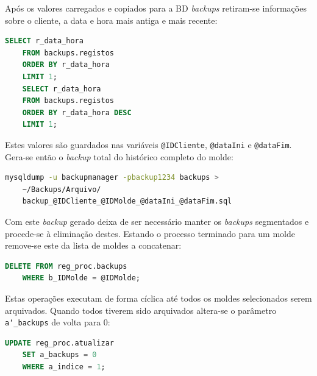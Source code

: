 \documentclass[11pt,twoside,a4paper]{report}
\begin{document}
Após os valores carregados e copiados para a BD \textit{backups} retiram-se informações sobre o cliente, a data e hora mais antiga e mais recente:
\begin{lstlisting}[language = SQL]
	SELECT r_data_hora
	FROM backups.registos
	ORDER BY r_data_hora
	LIMIT 1;
	SELECT r_data_hora
	FROM backups.registos
	ORDER BY r_data_hora DESC
	LIMIT 1;
\end{lstlisting}
Estes valores são guardados nas variáveis \texttt{@IDCliente}, \texttt{@dataIni} e \texttt{@dataFim}. Gera-se então o \textit{backup} total do histórico completo do molde:
\begin{lstlisting}[language = bash]
	mysqldump -u backupmanager -pbackup1234 backups >
	~/Backups/Arquivo/
	backup_@IDCliente_@IDMolde_@dataIni_@dataFim.sql
\end{lstlisting}
Com este \textit{backup} gerado deixa de ser necessário manter os \textit{backups} segmentados e procede-se à eliminação destes. Estando o processo terminado para um molde remove-se este da lista de moldes a concatenar:
\begin{lstlisting}[language = SQL]
	DELETE FROM reg_proc.backups
	WHERE b_IDMolde = @IDMolde;
\end{lstlisting}
Estas operações executam de forma cíclica até todos os moldes selecionados serem arquivados. Quando todos tiverem sido arquivados altera-se o parâmetro \texttt{a\char`_backups} de volta para 0:
\begin{lstlisting}[language = SQL]
	UPDATE reg_proc.atualizar
	SET a_backups = 0
	WHERE a_indice = 1;
\end{lstlisting}
\end{document}
